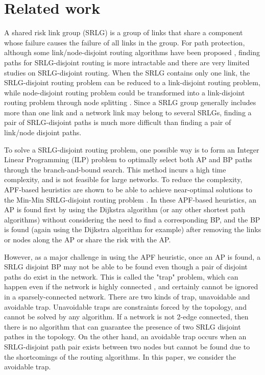 \section{Related work}
\label{sec:Related}
A shared risk link group (SRLG) is a group of links that
share a component whose failure causes the failure of all links
in the group. For path protection, although some link/node-disjoint routing algorithms have been proposed \cite{suurballe1984quick,bhandari1997optimal,li1990complexity,guo2003link,xu2004finding,beshir2011variants,guo2013finding,hu2003diverse}, finding paths for SRLG-disjoint routing is more intractable and there are very limited studies on SRLG-disjoint routing. When the SRLG contains only one link, the SRLG-disjoint routing problem can be reduced to a link-disjoint routing problem, while node-disjoint routing problem could be transformed into a link-disjoint routing problem through node splitting \cite{ford2015flows}.
Since a SRLG group generally includes more than one link and a network link may belong to several SRLGs, finding a pair of SRLG-disjoint paths is much more difficult than finding a pair of link/node disjoint paths.


To solve a SRLG-disjoint routing problem, one possible way is to form an Integer Linear Programming (ILP) \cite{hu2003diverse} problem to optimally select both AP and BP paths through the branch-and-bound search. This method incurs a high time complexity, and is not feasible for large networks. To reduce the complexity, APF-based heuristics are shown to be able to achieve near-optimal solutions to the Min-Min SRLG-disjoint routing problem \cite{oki2002disjoint,li2002fiber,eppstein1998finding}. In these APF-based heuristics, an AP is found first by using the Dijkstra algorithm (or any other shortest path algorithms) without considering the need to find a corresponding BP, and the BP is found (again using the Dijkstra algorithm for example) after removing the links or nodes along the AP or share the risk with the AP.

However, as a major challenge in using the APF heuristic, once an AP is found, a SRLG disjoint BP  may not be able to be found even though a pair of disjoint paths do exist in the network. This is called the "trap" problem, which can happen even if the network is highly connected \cite{laborczi2001solving}, and certainly cannot be ignored in a sparsely-connected network. There are two kinds of trap, unavoidable and avoidable trap. Unavoidable traps are constraints forced by the topology, and cannot be solved by any algorithm. If a network is not 2-edge connected, then there is no algorithm that can guarantee the presence of two SRLG disjoint pathes in the topology. On the other hand, an avoidable trap occurs when an SRLG-disjoint path pair exists between two nodes but  cannot be found due to the shortcomings of the routing algorithms. In this paper, we consider the avoidable trap.

